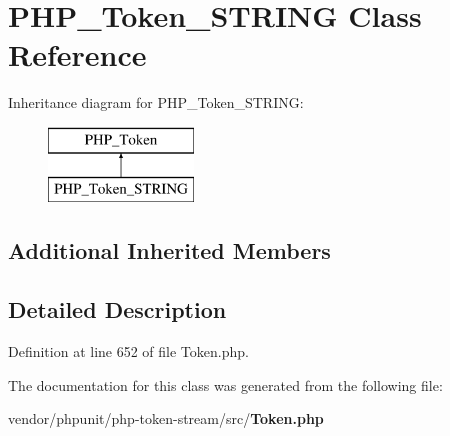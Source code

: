 \section{P\+H\+P\+\_\+\+Token\+\_\+\+S\+T\+R\+I\+N\+G Class Reference}
\label{class_p_h_p___token___s_t_r_i_n_g}
Inheritance diagram for P\+H\+P\+\_\+\+Token\+\_\+\+S\+T\+R\+I\+N\+G\+:\begin{figure}[H]
\begin{center}
\leavevmode
\includegraphics[height=2.000000cm]{class_p_h_p___token___s_t_r_i_n_g}
\end{center}
\end{figure}
\subsection*{Additional Inherited Members}


\subsection{Detailed Description}


Definition at line 652 of file Token.\+php.



The documentation for this class was generated from the following file\+:\begin{DoxyCompactItemize}
\item 
vendor/phpunit/php-\/token-\/stream/src/{\bf Token.\+php}\end{DoxyCompactItemize}
